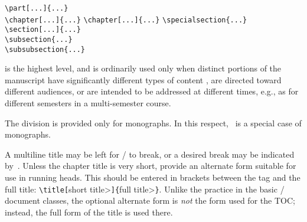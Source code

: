 \begingroup
{}%
\parindent0pt%
\verb+\part[...]{...}+\\
\ifmonograph\verb+\chapter[...]{...}+\break\fi
\ifmemoirs\verb+\chapter[...]{...}+\break\fi
\verb+\specialsection{...}+\\
\verb+\section[...]{...}+\\
\verb+\subsection{...}+\\
\verb+\subsubsection{...}+
\endgroup

 is the highest level, and is ordinarily used only when
distinct portions of the manuscript have significantly different
types of content%
\ifmonograph, are directed toward different audiences,
 or are intended to be addressed at different times, e.g., as
 for different semesters in a multi-semester course\fi.

\ifjournal
\else \ifproceedings
\else
 The  division is provided only for monographs.
\ifmemoirs
 In this respect, \Memos\ is a special case of monographs.
\fi


 A multiline title may be left for \latex/ to break, or a desired break
 may be indicated by \cn{\\}\,. Unless the chapter title is very short,
 provide an alternate form suitable for use in running heads.  This should
 be entered in brackets between the tag  and the full title:
 \verb+\title[+\<short title>\verb+]{+\<full title>\verb+}+.
 Unlike the practice in the basic \latex/ document classes, the optional
 alternate form is \emph{not} the form used for the TOC; instead, the
 full form of the title is used there.


